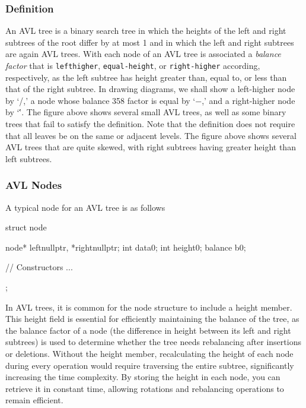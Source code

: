 \documentclass{report}
\begin{document}
\subsubsection{Definition}
\bigbreak \noindent 
An AVL tree is a binary search tree in which the heights of the left and right
subtrees of the root differ by at most 1 and in which the left and right subtrees
are again AVL trees.
\bigbreak \noindent 
With each node of an AVL tree is associated a \textit{balance factor} that is \texttt{lefthigher}, \texttt{equal-height}, or \texttt{right-higher} according, respectively, as the left subtree
has height greater than, equal to, or less than that of the right subtree.
\bigbreak \noindent 
{}
\bigbreak \noindent 
In drawing diagrams, we shall show a left-higher node by ‘/,’ a node whose balance 358
\bigbreak \noindent 
factor is equal by ‘−,’ and a right-higher node by ‘\.’. The figure above shows several
small AVL trees, as well as some binary trees that fail to satisfy the definition.
Note that the definition does not require that all leaves be on the same or
adjacent levels. 
\bigbreak \noindent 
{}
\bigbreak \noindent 
The figure above shows several AVL trees that are quite skewed, with right subtrees having greater height than left subtrees.


\bigbreak \noindent 
\subsubsection{AVL Nodes}
\bigbreak \noindent 
A typical node for an AVL tree is as follows
\bigbreak \noindent 
\begin{cppcode}
    struct node {
        node* left{nullptr}, *right{nullptr};
        int data{0};
        int height{0};
        balance b{0};

        // Constructors
            ... 
    };
\end{cppcode}
\bigbreak \noindent 
In AVL trees, it is common for the node structure to include a height member. This height field is essential for efficiently maintaining the balance of the tree, as the balance factor of a node (the difference in height between its left and right subtrees) is used to determine whether the tree needs rebalancing after insertions or deletions.
\bigbreak \noindent 
Without the height member, recalculating the height of each node during every operation would require traversing the entire subtree, significantly increasing the time complexity. By storing the height in each node, you can retrieve it in constant time, allowing rotations and rebalancing operations to remain efficient.
\end{document}
